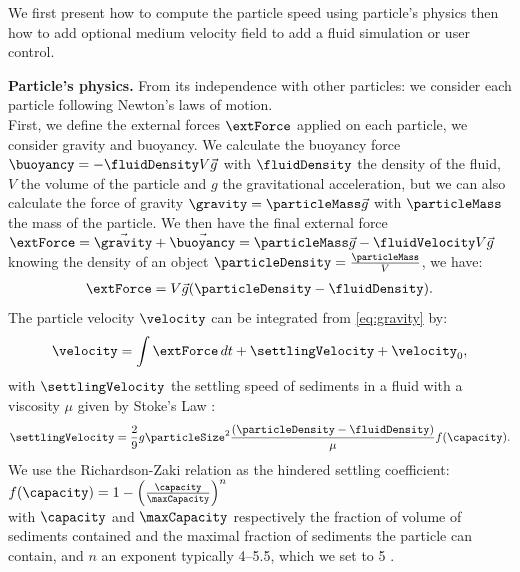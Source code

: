 We first present how to compute the particle speed using particle's physics then how to add optional medium velocity field to add a fluid simulation or user control.

\textbf{Particle's physics.}
From its independence with other particles: we consider each particle following Newton's laws of motion.\\
First, we define the external forces $\extForce$ applied on each particle, we consider gravity and buoyancy.
We calculate the buoyancy force $\buoyancy =-\fluidDensity V \vec g$ with $\fluidDensity$ the density of the fluid, $V$ the volume of the particle and $g$ the gravitational acceleration, but we can also calculate the force of gravity $\gravity = \particleMass \vec g$ with $\particleMass$ the mass of the particle. We then have the final external force $\extForce = \vec \gravity + \vec \buoyancy = \particleMass \vec g - \fluidVelocity V \vec g$ knowing the density of an object $\particleDensity = \frac{\particleMass}{V}$, we have:
\begin{align} \label{eq:gravity}
\extForce = V \vec g (\particleDensity - \fluidDensity ).
\end{align}
The particle velocity $\velocity$ can be integrated from \eqref{eq:gravity} by: 
\begin{align} \label{eq:velocity-computation}
\velocity = \int{ \extForce \, dt} + \settlingVelocity + \velocity_0,
\end{align}
with $\settlingVelocity$ the settling speed of sediments in a fluid with a viscosity $\mu$ given by Stoke's Law \cite{Stokes1850}: 
\begin{align} \label{eq:initialSettlingVelocity}
\settlingVelocity = \frac{ 2 }{ 9 }  g \particleSize^2 \frac{(\particleDensity - \fluidDensity)}{\mu } f(\capacity).
\end{align} 
We use the Richardson-Zaki relation as the hindered settling coefficient: \\$f(\capacity) = 1 - \left( \frac{\capacity}{ \maxCapacity } \right)^{n}$ \\with $\capacity$ and $\maxCapacity$ respectively the fraction of volume of sediments contained and the maximal fraction of sediments the particle can contain, and $n$ an exponent typically 4–5.5, which we set to 5 \cite{Richardson1954, Wojtan2007}.

